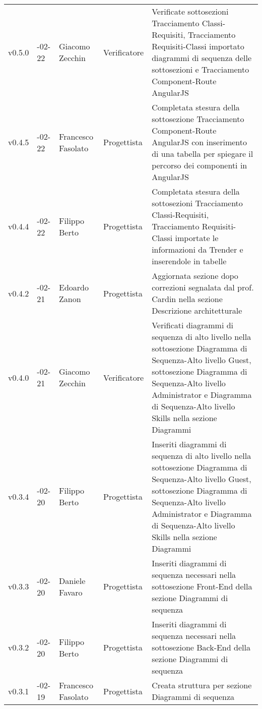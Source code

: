 \begin{longtable} { >{\centering}p{1.4cm} >{\centering}p{2cm} >{\centering}p{2.3cm} >{\centering}p{2.7cm} p{5.5cm} }
	v0.5.0 & 2017-02-22 & Giacomo Zecchin & Verificatore & Verificate sottosezioni Tracciamento Classi-Requisiti, Tracciamento Requisiti-Classi importato diagrammi di sequenza delle sottosezioni e Tracciamento Component-Route AngularJS \\
	\addlinespace[0.4em]
	\midrule
	\addlinespace[0.4em]
	v0.4.5 & 2017-02-22 & Francesco Fasolato & Progettista & Completata stesura della sottosezione Tracciamento Component-Route AngularJS con inserimento di una tabella per spiegare il percorso dei componenti in AngularJS  \\
	\addlinespace[0.4em]
	\midrule
	v0.4.4 & 2017-02-22 & Filippo Berto & Progettista & Completata stesura della sottosezioni Tracciamento Classi-Requisiti, Tracciamento Requisiti-Classi importate le informazioni da Trender e inserendole in tabelle \\
	\addlinespace[0.4em]
	\midrule
	\addlinespace[0.4em]
	v0.4.2 & 2017-02-21 & Edoardo Zanon & Progettista & Aggiornata sezione dopo correzioni segnalata dal prof. Cardin nella sezione Descrizione architetturale  \\
	\addlinespace[0.4em]
	\midrule
	\addlinespace[0.4em]
	v0.4.0 & 2017-02-21 & Giacomo Zecchin & Verificatore & Verificati diagrammi di sequenza di alto livello nella sottosezione Diagramma di Sequenza-Alto livello Guest,  sottosezione Diagramma di Sequenza-Alto livello Administrator e  Diagramma di Sequenza-Alto livello Skills nella sezione Diagrammi \\
	\addlinespace[0.4em]
	\midrule
	\addlinespace[0.4em]
	v0.3.4 & 2017-02-20 & Filippo Berto & Progettista & Inseriti diagrammi di sequenza di alto livello nella sottosezione Diagramma di Sequenza-Alto livello Guest,  sottosezione Diagramma di Sequenza-Alto livello Administrator e  Diagramma di Sequenza-Alto livello Skills nella sezione Diagrammi \\
	\addlinespace[0.4em]
	\midrule
	\addlinespace[0.4em]
	v0.3.3 & 2017-02-20 & Daniele Favaro & Progettista & Inseriti diagrammi di sequenza necessari nella sottosezione Front-End della sezione Diagrammi di  sequenza \\
	\addlinespace[0.4em]
	\midrule
	\addlinespace[0.4em]
	v0.3.2 & 2017-02-20 & Filippo Berto & Progettista & Inseriti diagrammi di sequenza necessari nella sottosezione Back-End della sezione Diagrammi di sequenza \\
	\addlinespace[0.4em]
	\midrule
	\addlinespace[0.4em]
	v0.3.1 & 2017-02-19 & Francesco Fasolato & Progettista & Creata struttura per sezione Diagrammi di  sequenza \\

\end{longtable}
